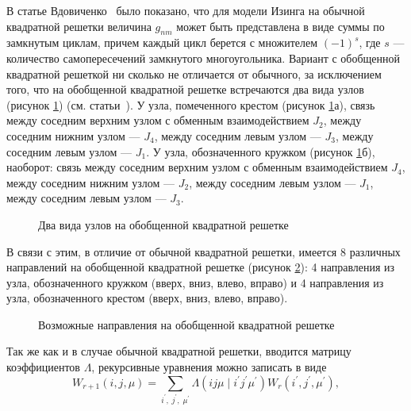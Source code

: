 В статье Вдовиченко~\cite{vdovichenko1965_1} было показано, что для модели Изинга на обычной квадратной решетки величина $g_{nm}$ может быть представлена в виде суммы по замкнутым циклам, причем каждый цикл берется с множителем $(-1)^s$, где $s$ --- количество самопересечений замкнутого многоугольника. Вариант с обобщенной квадратной решеткой ни сколько не отличается от обычного, за исключением того, что на обобщенной квадратной решетке встречаются два вида узлов (рисунок \ref{point}) (см. статьи~\cite{vaks1966, chikyu1987}). У узла, помеченного крестом (рисунок \ref{point}а), связь между соседним верхним узлом с обменным взаимодействием $J_2$, между соседним нижним узлом --- $J_4$, между соседним левым узлом --- $J_3$, между соседним левым узлом --- $J_1$. У узла, обозначенного кружком (рисунок \ref{point}б), наоборот: связь между соседним верхним узлом с обменным взаимодействием $J_4$, между соседним нижним узлом --- $J_2$, между соседним левым узлом --- $J_1$, между соседним левым узлом --- $J_3$. 

 \begin{figure}[h]
 	\begin{minipage}[h]{0.4\linewidth}
 	\end{minipage}
 	\hfill
 	\begin{minipage}[h]{0.4\linewidth}
 	\end{minipage}
 	\caption{Два вида узлов на обобщенной квадратной решетке}
 	\label{point}
 \end{figure}

В связи с этим, в отличие от обычной квадратной решетки, имеется 8 различных направлений на обобщенной квадратной решетке (рисунок \ref{directionGen}): 4 направления из узла, обозначенного кружком (вверх, вниз, влево, вправо) и 4 направления из узла, обозначенного крестом (вверх, вниз, влево, вправо).

 \begin{figure}[h]
 	\caption{Возможные направления на обобщенной квадратной решетке}
 	\label{directionGen}
 \end{figure}

Так же как и в случае обычной квадратной решетки, вводится матрицу коэффициентов $\Lambda$, рекурсивные уравнения можно записать в виде
\begin{equation}
W_{r+1}(i, j, \mu) = \sum_{i^{'},\; j^{'},\; \mu^{'}} \Lambda (ij\mu\; |\; i^{'}j^{'}\mu^{'}) W_{r} (i^{'}, j^{'}, \mu^{'}),
\end{equation}

